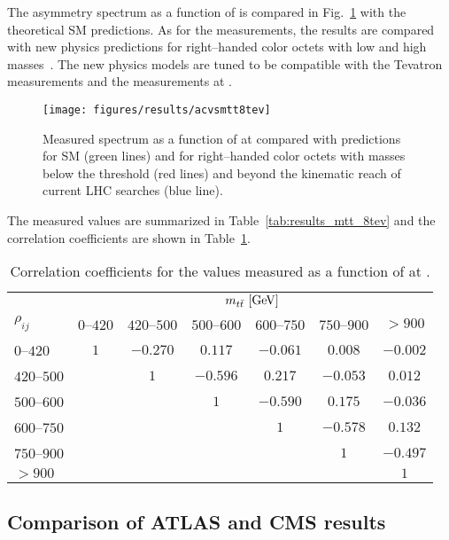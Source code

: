 The asymmetry spectrum as a function of \mtt{} is compared in
Fig.~\ref{fig:8tevacvsmtt} with the theoretical SM predictions.
As for the \seventev{} measurements, the results are compared with new
physics predictions for right--handed color octets with low and high
masses~\cite{Aguilar-Saavedra:2014nja}. The new physics models are
tuned to be compatible with the Tevatron \afb{} measurements and the
\ac{} measurements at \seventev{}.
\begin{figure}[!htb]\centering
  \texttt{[image: figures/results/acvsmtt8tev]}
  \caption{Measured \ac{} spectrum as a function of \mtt{} at
    \seventev{} compared with predictions for SM (green lines) and for right--handed
    color octets with masses below the \ttbar{} threshold (red lines) and beyond
    the kinematic reach of current LHC searches (blue line).}
  \label{fig:8tevacvsmtt}
\end{figure}
The measured \ac{} values are summarized in
Table~\ref{tab:results_mtt_8tev} and the correlation coefficients are
shown in Table~\ref{tab:corr_mtt8tev}.

%
\begin{table}[!htp]\centering
\begin{tabular}{l c c c c c c}
  \toprule
  &\multicolumn{6}{c}{$m_{t\bar{t}}{}~[\rm{GeV}]$}    \\
  $\rho_{ij}$ & $0$--$420$ & $420$--$500$ & $500$--$600$ &
  $600$--$750$ & $750$--$900$ & $>900$ \\
  \midrule
  $0$--$420$      & $1$ & $-0.270$ & $0.117$ & $-0.061$ & $0.008$ & $-0.002$ \\
  $420$--$500$    &     & $1$           & $-0.596$ & $0.217$ &
  $-0.053$ & $0.012$ \\
  $500$--$600$    &     &                   & $1$          & $-0.590$
  & $0.175$ & $-0.036$ \\
  $600$--$750$    &     &         &         & $1$     & $-0.578$ & $0.132$ \\
  $750$--$900$    &     &         &         &            & $1$ & $-0.497$ \\
  $>900$               &     &         &         &         &   &$1$     \\
  \bottomrule
\end{tabular}
\caption{Correlation coefficients for the \ac{} values measured as a
  function of \mtt{} at \eighttev{}.}
\label{tab:corr_mtt8tev}
\end{table}

\subsection{Comparison of ATLAS and CMS results}

